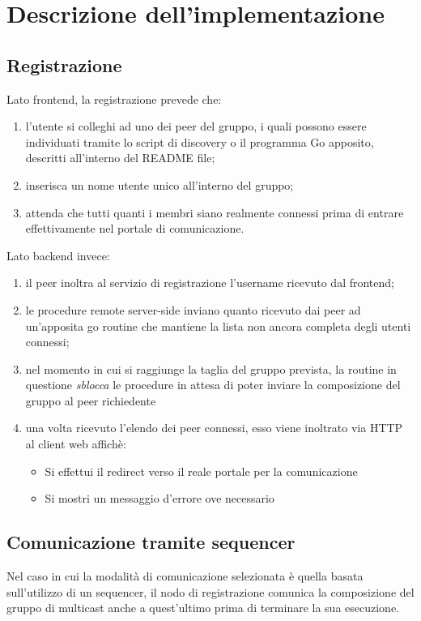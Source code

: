 \documentclass[conference]{IEEEtran}
\begin{document}
\section{Descrizione dell'implementazione}
\subsection{Registrazione}
Lato frontend, la registrazione prevede che:
\begin{enumerate}
\item l'utente si colleghi ad uno dei peer del gruppo, i quali possono essere individuati tramite lo script di discovery o il programma Go apposito, descritti all'interno del README file;
\item inserisca un nome utente unico all'interno del gruppo;
\item attenda che tutti quanti i membri siano realmente connessi prima di entrare effettivamente nel portale di comunicazione.
\end{enumerate}

Lato backend invece:
\begin{enumerate}
\item il peer inoltra al servizio di registrazione l'username ricevuto dal frontend;
\item le procedure remote server-side inviano quanto ricevuto dai peer ad un'apposita go routine che mantiene la lista non ancora completa degli utenti connessi;
\item nel momento in cui si raggiunge la taglia del gruppo prevista, la routine in questione \textit{sblocca} le procedure in attesa di poter inviare la composizione del gruppo al peer richiedente
\item una volta ricevuto l'elendo dei peer connessi, esso viene inoltrato via HTTP al client web affichè:
\begin{itemize}
\item Si effettui il redirect verso il reale portale per la comunicazione
\item Si mostri un messaggio d'errore ove necessario
\end{itemize}
\end{enumerate}

\subsection{Comunicazione tramite sequencer}
Nel caso in cui la modalità di comunicazione selezionata è quella basata sull'utilizzo di un sequencer, il nodo di registrazione comunica la composizione del gruppo di multicast anche a quest'ultimo prima di terminare la sua esecuzione.
\end{document}
